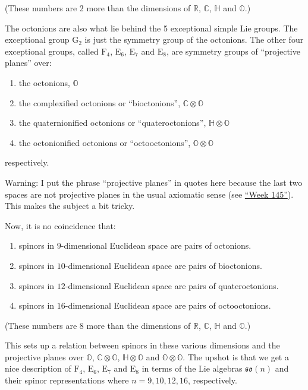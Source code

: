 \documentclass{article}
\def\tightlist{}
\begin{document}
(These numbers are 2 more than the dimensions of \(\mathbb{R}\),
\(\mathbb{C}\), \(\mathbb{H}\) and \(\mathbb{O}\).)

The octonions are also what lie behind the 5 exceptional simple Lie
groups. The exceptional group \(\mathrm{G}_2\) is just the symmetry
group of the octonions. The other four exceptional groups, called
\(\mathrm{F}_4\), \(\mathrm{E}_6\), \(\mathrm{E}_7\) and
\(\mathrm{E}_8\), are symmetry groups of ``projective planes'' over:

\begin{enumerate}
\def\labelenumi{\arabic{enumi})}
\tightlist
\item
  the octonions, \(\mathbb{O}\)
\item
  the complexified octonions or ``bioctonions'',
  \(\mathbb{C}\otimes\mathbb{O}\)
\item
  the quaternionified octonions or ``quateroctonions'',
  \(\mathbb{H}\otimes\mathbb{O}\)
\item
  the octonionified octonions or ``octooctonions'',
  \(\mathbb{O}\otimes\mathbb{O}\)
\end{enumerate}

respectively.

Warning: I put the phrase ``projective planes'' in quotes here because
the last two spaces are not projective planes in the usual axiomatic
sense (see \protect\hyperlink{week145}{``Week 145''}). This makes the
subject a bit tricky.

Now, it is no coincidence that:

\begin{enumerate}
\def\labelenumi{\arabic{enumi})}
\tightlist
\item
  spinors in \(9\)-dimensional Euclidean space are pairs of octonions.
\item
  spinors in \(10\)-dimensional Euclidean space are pairs of
  bioctonions.
\item
  spinors in \(12\)-dimensional Euclidean space are pairs of
  quateroctonions.
\item
  spinors in \(16\)-dimensional Euclidean space are pairs of
  octooctonions.
\end{enumerate}

(These numbers are 8 more than the dimensions of \(\mathbb{R}\),
\(\mathbb{C}\), \(\mathbb{H}\) and \(\mathbb{O}\).)

This sets up a relation between spinors in these various dimensions and
the projective planes over \(\mathbb{O}\),
\(\mathbb{C}\otimes\mathbb{O}\), \(\mathbb{H}\otimes\mathbb{O}\) and
\(\mathbb{O}\otimes\mathbb{O}\). The upshot is that we get a nice
description of \(\mathrm{F}_4\), \(\mathrm{E}_6\), \(\mathrm{E}_7\) and
\(\mathrm{E}_8\) in terms of the Lie algebras \(\mathfrak{so}(n)\) and
their spinor representations where \(n = 9, 10, 12, 16\), respectively.
\end{document}
